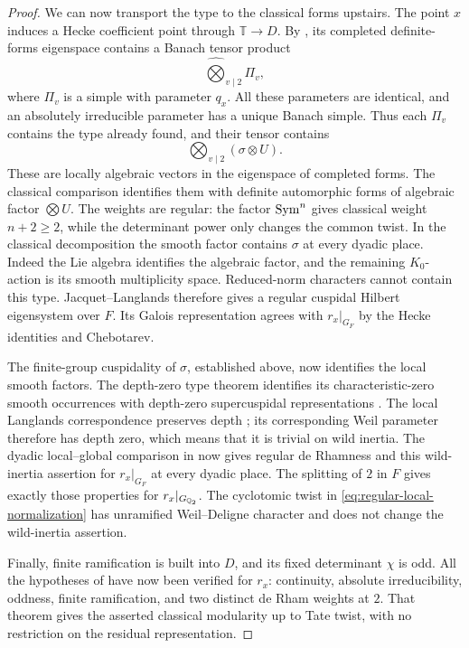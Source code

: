 \begin{proof}
We can now transport the type to the classical forms upstairs.
The point $x$ induces a Hecke coefficient point through
$\mathbb T\to D$.  By \cite[Proposition~4.2]{FM2}, its completed
definite-forms eigenspace contains a Banach tensor product
\[
                         \widehat\bigotimes_{v\mid2}\Pi_v,
\]
where $\Pi_v$ is a simple with parameter $q_x$.  All these parameters
are identical, and an absolutely irreducible parameter has a unique
Banach simple.  Thus each $\Pi_v$ contains the type already found,
and their tensor contains
\[
                         \bigotimes_{v\mid2}(\sigma\otimes U).
\]
These are locally algebraic vectors in the eigenspace of completed
forms.  The classical comparison
\cite[Proposition~4.1]{FM2} identifies them with definite automorphic
forms of algebraic factor $\bigotimes U$.  The weights are regular:
the factor $\operatorname{Sym}^n$ gives classical weight $n+2\geq2$, while the
determinant power only changes the common twist.  In the classical
decomposition the smooth factor contains $\sigma$ at every dyadic
place.  Indeed the Lie algebra identifies the algebraic factor,
and the remaining $K_0$-action is its smooth multiplicity space.
Reduced-norm characters cannot contain this type.  Jacquet--Langlands
therefore gives a regular cuspidal Hilbert eigensystem over $F$.
Its Galois representation agrees with $r_x|_{G_F}$ by the Hecke
identities and Chebotarev.

The finite-group cuspidality of $\sigma$, established above, now
identifies the local smooth factors. The depth-zero type theorem
identifies its characteristic-zero smooth occurrences with depth-zero
supercuspidal representations
\cite[Appendix~A, Sections~A.3.1--A.3.2]{Henniart2002}.
The local Langlands correspondence preserves depth
\cite[Theorem~2.9]{ABPS2016}; its corresponding Weil parameter
therefore has depth zero, which means that it is trivial on wild
inertia.
The dyadic local--global comparison in
\cite[Proposition~4.1]{FM2} now gives regular de Rhamness and this
wild-inertia assertion for $r_x|_{G_F}$ at every dyadic place.
The splitting of $2$ in $F$ gives exactly those properties for
$r_x|_{G_{\mathbb Q_2}}$.  The cyclotomic twist in
\eqref{eq:regular-local-normalization} has unramified Weil--Deligne
character and does not change the wild-inertia assertion.

Finally, finite ramification is built into $D$, and its fixed
determinant $\chi$ is odd.  All the hypotheses of
\cite[Theorem~1.1]{FM2} have now been verified for $r_x$: continuity,
absolute irreducibility, oddness, finite ramification, and two
distinct de Rham weights at $2$.  That theorem gives the asserted
classical modularity up to Tate twist, with no restriction on the
residual representation.
\end{proof}
